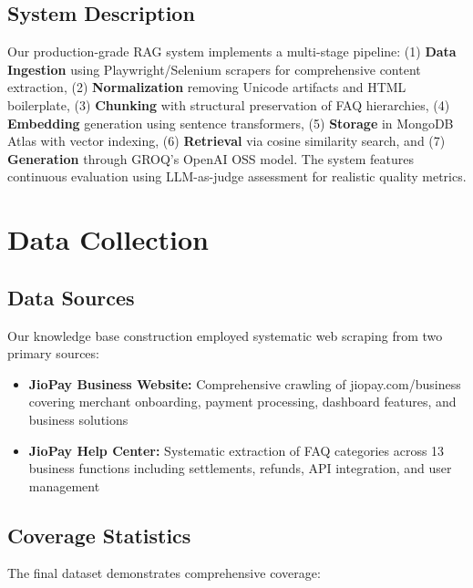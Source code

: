 \documentclass[11pt,a4paper]{article}
\begin{document}
\subsection{System Description}

Our production-grade RAG system implements a multi-stage pipeline: (1) \textbf{Data Ingestion} using Playwright/Selenium scrapers for comprehensive content extraction, (2) \textbf{Normalization} removing Unicode artifacts and HTML boilerplate, (3) \textbf{Chunking} with structural preservation of FAQ hierarchies, (4) \textbf{Embedding} generation using sentence transformers, (5) \textbf{Storage} in MongoDB Atlas with vector indexing, (6) \textbf{Retrieval} via cosine similarity search, and (7) \textbf{Generation} through GROQ's OpenAI OSS model. The system features continuous evaluation using LLM-as-judge assessment for realistic quality metrics.

\section{Data Collection}

\subsection{Data Sources}

Our knowledge base construction employed systematic web scraping from two primary sources:

\begin{itemize}
    \item \textbf{JioPay Business Website:} Comprehensive crawling of jiopay.com/business covering merchant onboarding, payment processing, dashboard features, and business solutions
    \item \textbf{JioPay Help Center:} Systematic extraction of FAQ categories across 13 business functions including settlements, refunds, API integration, and user management
\end{itemize}

\subsection{Coverage Statistics}

The final dataset demonstrates comprehensive coverage:
\end{document}
